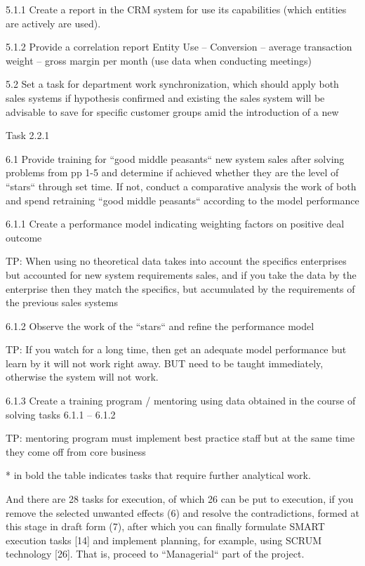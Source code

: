 \documentclass[11pt,a4paper]{book}
\begin{document}
5.1.1 Create a report in the CRM system for use its capabilities (which
entities are actively are used).

5.1.2 Provide a correlation report Entity Use -- Conversion -- average
transaction weight -- gross margin per month (use data when conducting
meetings)

5.2 Set a task for department work synchronization, which should apply both
sales systems if hypothesis confirmed and existing the sales system will be
advisable to save for specific customer groups amid the introduction of a new

Task 2.2.1

6.1 Provide training for “good middle peasants“ new system sales after solving
problems from pp 1-5 and determine if achieved whether they are the level of
“stars“ through set time. If not, conduct a comparative analysis the work of
both and spend retraining “good middle peasants“ according to the model
performance

6.1.1 Create a performance model indicating weighting factors on positive deal
outcome

TP: When using no theoretical data takes into account the specifics
enterprises but accounted for new system requirements sales, and if you take
the data by the enterprise then they match the specifics, but accumulated by
the requirements of the previous sales systems

6.1.2 Observe the work of the “stars“ and refine the performance model

TP: If you watch for a long time, then get an adequate model performance but
learn by it will not work right away. BUT need to be taught immediately,
otherwise the system will not work.

6.1.3 Create a training program / mentoring using data obtained in the course
of solving tasks 6.1.1 -- 6.1.2

TP: mentoring program must implement best practice staff but at the same time
they come off from core business


* in bold the table indicates tasks that require further analytical work.

And there are 28 tasks for execution, of which 26 can be put to execution, if
you remove the selected unwanted effects (6) and resolve the contradictions,
formed at this stage in draft form (7), after which you can finally formulate
SMART execution tasks [14] and implement planning, for example, using SCRUM
technology [26]. That is, proceed to “Managerial“ part of the project.
\end{document}
